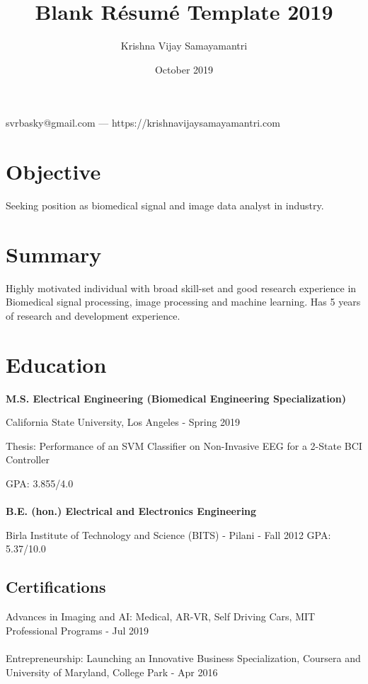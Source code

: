 \documentclass{article}
\makeatletter
\renewcommand{\maketitle}{
\begin{center}
    {\huge\bfseries
    \theauthor}
    
    \vspace{.25em}
    
    svrbasky@gmail.com --- https://krishnavijaysamayamantri.com
    
\end{center}
}
\makeatother
\begin{document}
\title{Blank R\'esum\'e Template 2019}
\author{Krishna Vijay Samayamantri}
\date{October 2019}
\maketitle


\section{Objective}
Seeking position as biomedical signal and image data analyst in industry.

\section{Summary}
Highly motivated individual with broad skill-set and good research experience in Biomedical signal processing, image processing and machine learning. Has 5 years of research and development experience.

\section{Education}
\textbf{M.S. Electrical Engineering (Biomedical Engineering Specialization)}

\noindent   
California State University, Los Angeles - Spring 2019

\noindent   
Thesis: Performance of an SVM Classifier on Non-Invasive EEG for a 2-State BCI Controller 

\noindent
GPA: 3.855/4.0 \\
\\

\noindent
\textbf{B.E. (hon.) Electrical and Electronics Engineering}

\noindent
Birla Institute of Technology and Science (BITS) - Pilani - Fall 2012
\noindent
GPA: 5.37/10.0

\subsection{Certifications}
Advances in Imaging and AI: Medical, AR-VR, Self Driving Cars, MIT Professional Programs - Jul 2019
\\
\\
\noindent
Entrepreneurship: Launching an Innovative Business Specialization, Coursera and University of Maryland, College Park - Apr 2016
\end{document}
